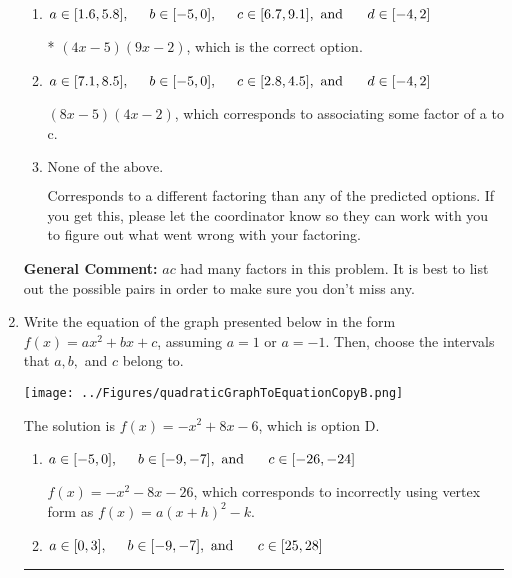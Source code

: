 \documentclass{extbook}[14pt]
\newcommand{\litem}[1]{\item #1

\rule{\textwidth}{0.4pt}}
\begin{document}
\begin{enumerate}
{\begin{enumerate}[label=\Alph*.]
 $(x -5)(27x -2)$, which corresponds to associating some factor of c to a.
\item \( a \in [1.6, 5.8], \hspace*{5mm} b \in [-5, 0], \hspace*{5mm} c \in [6.7, 9.1], \text{ and } \hspace*{5mm} d \in [-4, 2] \)

* $(4x -5)(9x -2)$, which is the correct option.
\item \( a \in [7.1, 8.5], \hspace*{5mm} b \in [-5, 0], \hspace*{5mm} c \in [2.8, 4.5], \text{ and } \hspace*{5mm} d \in [-4, 2] \)

 $(8x -5)(4x -2)$, which corresponds to associating some factor of a to c.
\item \( \text{None of the above.} \)

 Corresponds to a different factoring than any of the predicted options. If you get this, please let the coordinator know so they can work with you to figure out what went wrong with your factoring.
\end{enumerate}

\textbf{General Comment:} $ac$ had many factors in this problem. It is best to list out the possible pairs in order to make sure you don't miss any.
}
\litem{
Write the equation of the graph presented below in the form $f(x)=ax^2+bx+c$, assuming  $a=1$ or $a=-1$. Then, choose the intervals that $a, b,$ and $c$ belong to.

\begin{center}
    \texttt{[image: ../Figures/quadraticGraphToEquationCopyB.png]}
\end{center}


The solution is \( f(x) = -x^{2} +8 x -6 \), which is option D.\begin{enumerate}[label=\Alph*.]
\item \( a \in [-5, 0], \hspace*{5mm} b \in [-9, -7], \text{ and } \hspace*{5mm} c \in [-26, -24] \)

$f(x)=-x^{2} -8 x -26$, which corresponds to incorrectly using vertex form as $f(x) = a(x+h)^2 - k$.
\item \( a \in [0, 3], \hspace*{5mm} b \in [-9, -7], \text{ and } \hspace*{5mm} c \in [25, 28] \)


\end{enumerate}}
\end{enumerate}
\end{document}
